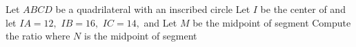 Let $ABCD$ be a quadrilateral with an inscribed circle  Let $I$ be the center of  and let $IA=12,$ $IB=16,$ $IC=14,$ and  Let $M$ be the midpoint of segment  Compute the ratio  where $N$ is the midpoint of segment 